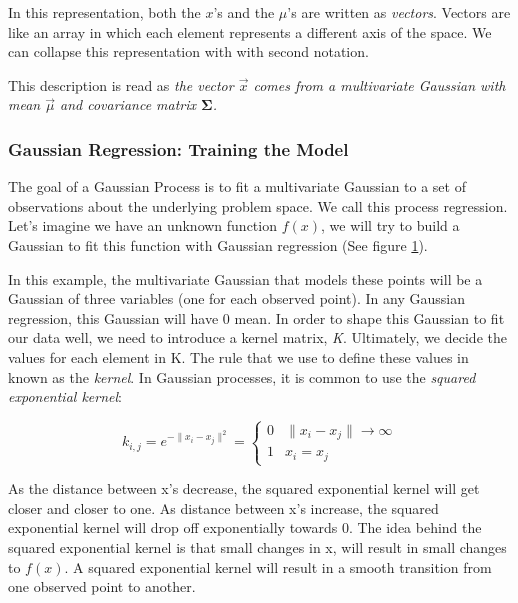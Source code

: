 \documentclass{sig-alternate}
\begin{document}
In this representation, both the $x$'s and the $\mu$'s are written as \textit{vectors}.
Vectors are like an array in which each element represents a different axis of the space.
We can collapse this representation with with second notation.

This description is read as \textit{the vector $\Vec{x}$ comes from a multivariate Gaussian with mean $\Vec{\mu}$ and covariance matrix $\mathbf{\Sigma}$.}

\subsubsection{Gaussian Regression: Training the Model}

The goal of a Gaussian Process is to fit a multivariate Gaussian to a set of observations about the underlying problem space.
We call this process regression.
Let's imagine we have an unknown function $f(x)$, we will try to build a Gaussian to fit this function with Gaussian regression (See figure \ref{fig:GPRegression}).

\begin{figure}[htb]
\centering
{}
\caption{}
\label{fig:GPRegression}
\end{figure}

In this example, the multivariate Gaussian that models these points will be a Gaussian of three variables (one for each observed point).
In any Gaussian regression, this Gaussian will have 0 mean.
In order to shape this Gaussian to fit our data well, we need to introduce a kernel matrix, \textit{K}.
Ultimately, we decide the values for each element in K.
The rule that we use to define these values in known as the \textit{kernel}.
In Gaussian processes, it is common to use the \textit{squared exponential kernel}:

\[k_{i,j} = e^{-\|x_{i} - x_{j} \|^{2}} = 
    \begin{cases} 
      0 & \|x_{i} - x_{j} \| \rightarrow \infty\\
      1 & x_{i} = x_{j}
    \end{cases}\]
    
As the distance between x's decrease, the squared exponential kernel will get closer and closer to one.
As distance between x's increase, the squared exponential kernel will drop off exponentially towards 0.
The idea behind the squared exponential kernel is that small changes in x, will result in small changes to $f(x)$. A squared exponential kernel will result in a smooth transition from one observed point to another. 
\end{document}
